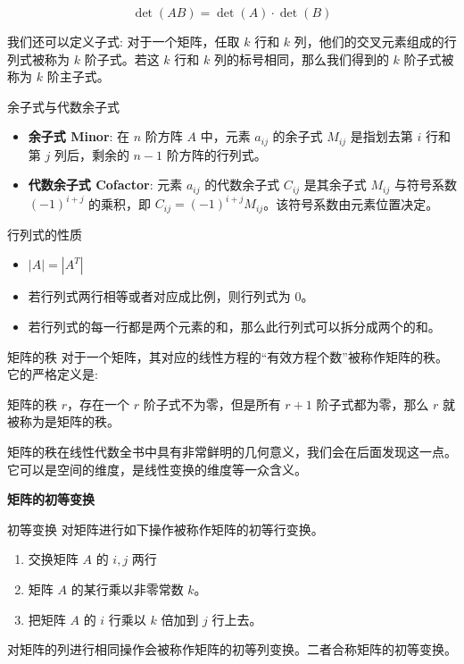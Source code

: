 \documentclass[a4paper,12pt]{ctexart}
\begin{document}
\[
\det(AB) = \det(A) \cdot \det(B)
\]

\newpage
        
        我们还可以定义子式: 对于一个矩阵，任取 $k$ 行和 $k$ 列，他们的交叉元素组成的行列式被称为 $k$ 阶子式。若这 $k$ 行和 $k$ 列的标号相同，那么我们得到的 $k$ 阶子式被称为 $k$ 阶主子式。
        
        \begin{mydef}{余子式与代数余子式}{}
            \begin{itemize}
                \item \textbf{余子式 Minor}: 在 $n$ 阶方阵 $A$ 中，元素 $a_{ij}$ 的余子式 $M_{ij}$ 是指划去第 $i$ 行和第 $j$ 列后，剩余的 $n-1$ 阶方阵的行列式。
                \item \textbf{代数余子式 Cofactor}: 元素 $a_{ij}$ 的代数余子式 $C_{ij}$ 是其余子式 $M_{ij}$ 与符号系数 $(-1)^{i+j}$ 的乘积，即 $C_{ij} = (-1)^{i+j} M_{ij}$。该符号系数由元素位置决定。
            \end{itemize}
        \end{mydef}
        
        \begin{myprop}{行列式的性质}{}
        \begin{itemize}
            \item $|A| = |A^T|$
            \item 若行列式两行相等或者对应成比例，则行列式为 $0$。
            \item 若行列式的每一行都是两个元素的和，那么此行列式可以拆分成两个的和。
        \end{itemize}
        \end{myprop}
        
        \begin{mydef}{矩阵的秩}{}
            对于一个矩阵，其对应的线性方程的“有效方程个数”被称作矩阵的秩。它的严格定义是:
            
            矩阵的秩 $r$，存在一个 $r$ 阶子式不为零，但是所有 $r+1$ 阶子式都为零，那么 $r$ 就被称为是矩阵的秩。
            
            矩阵的秩在线性代数全书中具有非常鲜明的几何意义，我们会在后面发现这一点。它可以是空间的维度，是线性变换的维度等一众含义。
        \end{mydef}

    \textbf{矩阵的初等变换}
    
    \begin{mydef}{初等变换}{}
    对矩阵进行如下操作被称作矩阵的初等行变换。
    \begin{enumerate}
        \item 交换矩阵 $A$ 的 $i,j$ 两行
        \item 矩阵 $A$ 的某行乘以非零常数 $k$。
        \item 把矩阵 $A$ 的 $i$ 行乘以 $k$ 倍加到 $j$ 行上去。
    \end{enumerate}
    对矩阵的列进行相同操作会被称作矩阵的初等列变换。二者合称矩阵的初等变换。
    \end{mydef}
    
\end{document}
